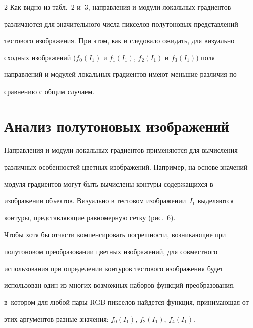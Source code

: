 \begin{multicols}{2}
  Как видно из табл.~2 и~3, направления и модули локальных градиентов

различаются для значительного числа пикселов полутоновых представлений

тестового изображения. При этом, как и следовало ожидать, для визуально

сходных изображений ($f_0(I_1)$ и $f_1(I_1)$, $f_2(I_1)$ и $f_3(I_1)$) поля

направлений и модулей локальных градиентов имеют меньшие различия по

сравнению с общим случаем.











\section{Анализ полутоновых изображений}



  Направления и модули локальных градиентов применяются для вычисления

различных особенностей цветных изображений. Например, на основе значений

модуля градиентов могут быть вычислены контуры содержащихся в

изображении объектов. Визуально в тестовом изображении~$I_1$ выделяются

контуры, представляющие равномерную сетку (рис.~6).







  Чтобы хотя бы отчасти компенсировать погрешности, возникающие при

полутоновом преобра\-зовании цветных изображений, для совместного

использова\-ния при определении контуров тестового изображения будет

использован один из многих возможных наборов функций преобразования,

в~котором для любой пары RGB-пик\-се\-лов найдется функция, принимающая от

этих аргументов разные значения: $f_0(I_1)$, $f_2(I_1)$, $f_4(I_1)$.










\end{multicols}
